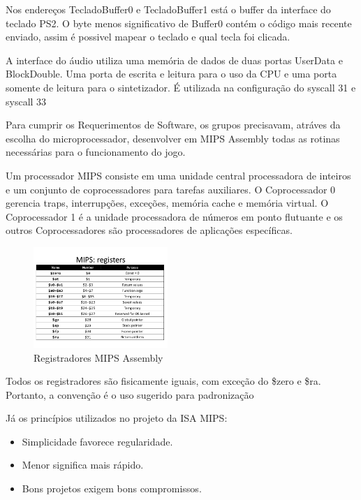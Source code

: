 \documentclass{vgtc}                          %
\begin{document}
Nos endereços TecladoBuffer0 e TecladoBuffer1 está o buffer da interface do teclado PS2. O byte menos significativo de Buffer0 contém o código mais recente enviado, assim é possivel mapear o teclado e qual tecla foi clicada.
   
A interface do áudio utiliza uma memória de dados de duas portas UserData e BlockDouble. Uma porta de escrita e leitura para o uso da CPU e uma porta somente de leitura para o sintetizador. É utilizada na configuração do syscall 31 e syscall 33

Para cumprir os Requerimentos de Software, os grupos precisavam, atráves da escolha do microprocessador, desenvolver em MIPS Assembly todas as rotinas necessárias para o funcionamento do jogo.

Um processador MIPS consiste em uma unidade central processadora de inteiros e um conjunto de coprocessadores para tarefas auxiliares. O Coprocessador 0 gerencia traps, interrupções, exceções, memória cache e memória virtual. O Coprocessador 1 é a unidade processadora de números em ponto flutuante e os outros Coprocessadores são processadores de aplicações específicas.

\begin{figure}[htbp]
  \centering
  \includegraphics[width=2in]{register.jpg}
 \caption{Registradores MIPS Assembly}
\end{figure}

Todos os registradores são fisicamente iguais, com exceção do \$zero e \$ra. Portanto, a convenção é o uso sugerido para padronização

Já os princípios utilizados no projeto da ISA MIPS:
\begin{itemize}
\item Simplicidade favorece regularidade.
\item Menor significa mais rápido.
\item Bons projetos exigem bons compromissos. 
\end{itemize}
\end{document}
